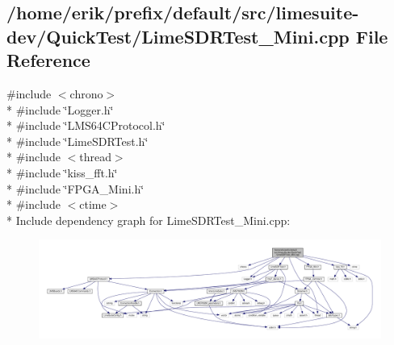 \subsection{/home/erik/prefix/default/src/limesuite-\/dev/\+Quick\+Test/\+Lime\+S\+D\+R\+Test\+\_\+\+Mini.cpp File Reference}
\label{LimeSDRTest__Mini_8cpp}
{\ttfamily \#include $<$chrono$>$}\\*
{\ttfamily \#include \char`\"{}Logger.\+h\char`\"{}}\\*
{\ttfamily \#include \char`\"{}L\+M\+S64\+C\+Protocol.\+h\char`\"{}}\\*
{\ttfamily \#include \char`\"{}Lime\+S\+D\+R\+Test.\+h\char`\"{}}\\*
{\ttfamily \#include $<$thread$>$}\\*
{\ttfamily \#include \char`\"{}kiss\+\_\+fft.\+h\char`\"{}}\\*
{\ttfamily \#include \char`\"{}F\+P\+G\+A\+\_\+\+Mini.\+h\char`\"{}}\\*
{\ttfamily \#include $<$ctime$>$}\\*
Include dependency graph for Lime\+S\+D\+R\+Test\+\_\+\+Mini.\+cpp\+:
\nopagebreak
\begin{figure}[H]
\begin{center}
\leavevmode
\includegraphics[width=350pt]{d6/d65/LimeSDRTest__Mini_8cpp__incl}
\end{center}
\end{figure}
